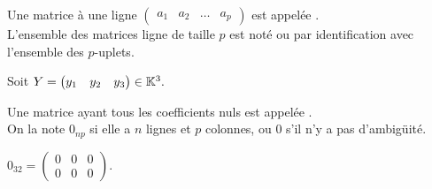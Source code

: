 \documentclass{book}
\begin{document}
\begin{Definition}
Une matrice à une ligne  $\begin{pmatrix}a_1&a_2& \dots &a_p \end{pmatrix}$ est appelée .\\ 
L'ensemble des matrices ligne de taille $p$ est noté   ou   par identification avec l'ensemble des $p$-uplets.
\end{Definition}
\begin{Exemple}
Soit $Y=\begin{pmatrix}y_1&y_2&y_3\end{pmatrix}\in\mathbb{K}^3.$
\end{Exemple}

\begin{Definition}
Une matrice ayant tous les coefficients nuls  est appelée .\\
On la note $0_{n p}$ si elle a $n$ lignes et $p$ colonnes, ou $0$ s'il n'y a pas d'ambigüité.
\end{Definition}
\begin{Exemple}
$0_{32}=\begin{pmatrix}
0&0&0 \\0&0&0
\end{pmatrix}$.
\end{Exemple}
\end{document}
